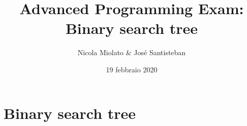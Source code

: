 \fi

\let\rmarkdownfootnote\footnote%
\def\footnote{\protect\rmarkdownfootnote}

\usepackage{titling}

\newcommand{\subtitle}[1]{
  \posttitle{
    \begin{center}\large#1\end{center}
    }
}

\setlength{\droptitle}{-2em}

  \title{Advanced Programming Exam: Binary search tree}
    \pretitle{\vspace{\droptitle}\centering\huge}
  \posttitle{\par}
    \author{Nicola Miolato \& José Santisteban}
    \preauthor{\centering\large\emph}
  \postauthor{\par}
      \predate{\centering\large\emph}
  \postdate{\par}
    \date{19 febbraio 2020}



\maketitle

\section{Binary search tree}\label{binary-search-tree}

